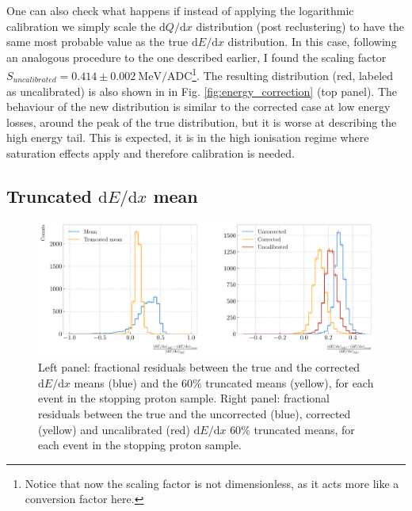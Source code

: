 One can also check what happens if instead of applying the logarithmic calibration we simply scale the $\mathrm{d}Q/\mathrm{d}x$ distribution (post reclustering) to have the same most probable value as the true  $\mathrm{d}E/\mathrm{d}x$ distribution. In this case, following an analogous procedure to the one described earlier, I found the scaling factor $S_{uncalibrated}=0.414\pm0.002~\mathrm{MeV}/\mathrm{ADC}$\footnote{Notice that now the scaling factor is not dimensionless, as it acts more like a conversion factor here.}. The resulting distribution (red, labeled as uncalibrated) is also shown in in Fig. \ref{fig:energy_correction} (top panel). The behaviour of the new distribution is similar to the corrected case at low energy losses, around the peak of the true distribution, but it is worse at describing the high energy tail. This is expected, it is in the high ionisation regime where saturation effects apply and therefore calibration is needed.

\subsection[Truncated \texorpdfstring{$\mathrm{d}E/\mathrm{d}x$}{dE/dx} mean]{Truncated \boldmath\texorpdfstring{$\mathrm{d}E/\mathrm{d}x$}{dE/dx} mean} \label{subsec:mean_dEdx}

\begin{figure}[t]
	\centering
	\includegraphics[width=.90\linewidth]{Images/GArSoft_PID/dEdx/reco_dEdx_truncation_comp.pdf}
	\caption[Fractional residuals between the true and the corrected $\mathrm{d}E/\mathrm{d}x$ means and the $60\%$ truncated means, and fractional residuals between the true and the uncorrected, corrected and uncalibrated $\mathrm{d}E/\mathrm{d}x$ $60\%$ truncated means.]{Left panel: fractional residuals between the true and the corrected $\mathrm{d}E/\mathrm{d}x$ means (blue) and the $60\%$ truncated means (yellow), for each event in the stopping proton sample. Right panel: fractional residuals between the true and the uncorrected (blue), corrected (yellow) and uncalibrated (red) $\mathrm{d}E/\mathrm{d}x$ $60\%$ truncated means, for each event in the stopping proton sample.}
	\label{fig:energy_trucation_comp}
\end{figure}

